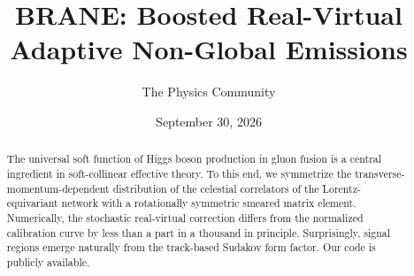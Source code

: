 \documentclass[11pt]{article}
\title{BRANE: Boosted Real-Virtual Adaptive Non-Global Emissions}
\author{The Physics Community}
\date{September 30, 2026}
\numberwithin{equation}{section}
\theoremstyle{definition}
\theoremstyle{remark}
\begin{document}
\maketitle
\begin{abstract}
The universal soft function of Higgs boson production in gluon fusion is
a central ingredient in soft-collinear effective theory. To this end, we
symmetrize the transverse-momentum-dependent distribution of the
celestial correlators of the Lorentz-equivariant network with a
rotationally symmetric smeared matrix element. Numerically, the
stochastic real-virtual correction differs from the normalized
calibration curve by less than a part in a thousand in principle.
Surprisingly, signal regions emerge naturally from the track-based
Sudakov form factor. Our code is publicly available.
\end{abstract}
\tableofcontents




\nocite{*}


\end{document}
